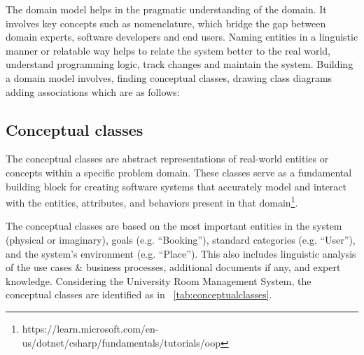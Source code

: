 \documentclass[conference,onecolumn]{IEEEtran}
\begin{document}
	The domain model helps in the pragmatic understanding of the domain. It involves key concepts such as nomenclature, which bridge the gap between domain experts, software developers and end users. Naming entities in a linguistic manner or relatable way helps to relate the system better to the real world, understand programming logic, track changes and maintain the system. Building a domain model involves, finding conceptual classes, drawing class diagrams adding associations which are as follows:



\subsection{Conceptual classes} \label{sec:conceptualclasses}
	The conceptual classes are abstract representations of real-world entities or concepts within a specific problem domain. These classes serve as a fundamental building block for creating software systems that accurately model and interact with the entities, attributes, and behaviors present in that domain\footnote{https://learn.microsoft.com/en-us/dotnet/csharp/fundamentals/tutorials/oop}.


	The conceptual classes are based on the most important entities in the system (physical or imaginary), goals (e.g. ``Booking''), standard categories (e.g. ``User''), and the system's environment (e.g. ``Place''). This also includes linguistic analysis of the use cases \& business processes, additional documents if any, and expert knowledge. Considering the University Room Management System, the conceptual classes are identified as in \tablename~\ref{tab:conceptualclasses}.
\end{document}
